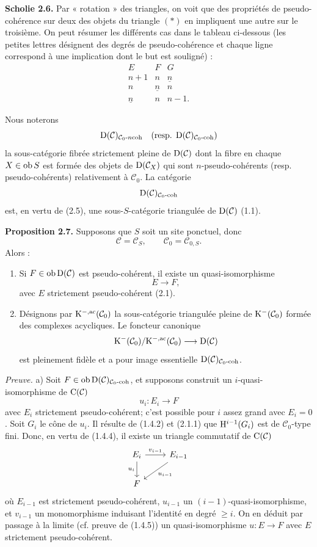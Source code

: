 \documentclass[11pt]{article}
\begin{document}
\textbf{Scholie 2.6.} Par « rotation » des triangles, on voit que des propriétés de pseudo-cohérence sur deux des objets du triangle \((*)\) en impliquent une autre sur le troisième. On peut résumer les différents cas dans le tableau ci-dessous (les petites lettres désignent des degrés de pseudo-cohérence et chaque ligne correspond à une implication dont le but est souligné) :
\[
\begin{array}{ccc}
E&F&G\\[0.2em]
n+1&n&\underline n\\
n&\underline n&n\\
\underline n&n&n-1 .
\end{array}
\]

Nous noterons
\[
  \mathrm D(\mathcal C)_{\mathcal C_0\text{-}n\mathrm{coh}}
  \quad\text{(resp. }\mathrm D(\mathcal C)_{\mathcal C_0\text{-}\mathrm{coh}}\text{)}
\]
la sous-catégorie fibrée strictement pleine de \(\mathrm D(\mathcal C)\) dont la fibre en chaque \(X\in\operatorname{ob} S\) est formée des objets de \(\mathrm D(\mathcal C_X)\) qui sont \(n\)-pseudo-cohérents (resp. pseudo-cohérents) relativement à \(\mathcal C_0\). La catégorie
\[
  \mathrm D(\mathcal C)_{\mathcal C_0\text{-}\mathrm{coh}}
\]
est, en vertu de (2.5), une sous-\(S\)-catégorie triangulée de \(\mathrm D(\mathcal C)\) (1.1).

\textbf{Proposition 2.7.} Supposons que \(S\) soit un site ponctuel, donc
\[
  \mathcal C=\mathcal C_S,\qquad \mathcal C_0=\mathcal C_{0,S}.
\]
Alors :
\begin{enumerate}[label=\alph*)]
\item Si \(F\in\operatorname{ob}\mathrm D(\mathcal C)\) est pseudo-cohérent, il existe un quasi-isomorphisme
\[
  E\longrightarrow F,
\]
avec \(E\) strictement pseudo-cohérent (2.1).
\item Désignons par \(\mathrm K^{-,\mathrm{ac}}(\mathcal C_0)\) la sous-catégorie triangulée pleine de \(\mathrm K^-(\mathcal C_0)\) formée des complexes acycliques. Le foncteur canonique
\[
  \mathrm K^-(\mathcal C_0)/\mathrm K^{-,\mathrm{ac}}(\mathcal C_0)
  \longrightarrow \mathrm D(\mathcal C)
\]
est pleinement fidèle et a pour image essentielle \(\mathrm D(\mathcal C)_{\mathcal C_0\text{-}\mathrm{coh}}\).
\end{enumerate}

\emph{Preuve.} a) Soit \(F\in\operatorname{ob}\mathrm D(\mathcal C)_{\mathcal C_0\text{-}\mathrm{coh}}\), et supposons construit un \(i\)-quasi-isomorphisme de \(\mathrm C(\mathcal C)\)
\[
  u_i:E_i\longrightarrow F
\]
avec \(E_i\) strictement pseudo-cohérent; c'est possible pour \(i\) assez grand avec \(E_i=0\). Soit \(G_i\) le cône de \(u_i\). Il résulte de (1.4.2) et (2.1.1) que \(\mathrm H^{i-1}(G_i)\) est de \(\mathcal C_0\)-type fini. Donc, en vertu de (1.4.4), il existe un triangle commutatif de \(\mathrm C(\mathcal C)\)
\[
\begin{tikzcd}
E_i \arrow[r,"v_{i-1}"] \arrow[d,"u_i"'] & E_{i-1} \arrow[dl,"u_{i-1}"]\\
F &
\end{tikzcd}
\]
où \(E_{i-1}\) est strictement pseudo-cohérent, \(u_{i-1}\) un \((i-1)\)-quasi-isomorphisme, et \(v_{i-1}\) un monomorphisme induisant l'identité en degré \(\geq i\). On en déduit par passage à la limite (cf. preuve de (1.4.5)) un quasi-isomorphisme \(u:E\to F\) avec \(E\) strictement pseudo-cohérent.
\end{document}
